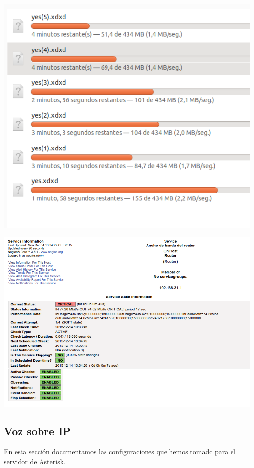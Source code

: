 \documentclass[]{article}
\begin{document}
\begin{center}
	\includegraphics[scale=0.5]{images/snmp/nagios/descargas.png}
\end{center}
\begin{center}
	\includegraphics[scale=0.5]{images/snmp/nagios/critical bandwidth.png}
\end{center}

\subsection{Voz sobre IP}
En esta sección documentamos las configuraciones que hemos tomado para el servidor de Asterisk.
\end{document}
